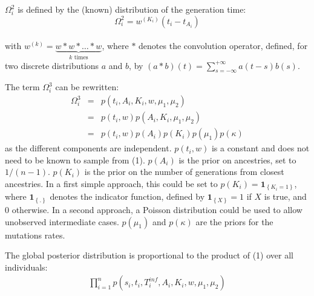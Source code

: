 \documentclass[10pt]{article}
\begin{document}
$\Omega_i^2$ is defined by the (known) distribution of the generation time:
$$
\Omega_i^2 = w^{\left(K_i\right)}(t_i - t_{A_i})
$$
~\\

with $w^{\left(k\right)} = \underbrace{w*w*\ldots*w}_{k \text{ times}} $, where $*$ denotes the convolution operator, defined, for two discrete distributions $a$ and $b$, by $\left(a*b\right)\left(t\right) = \sum_{s=-\infty}^{+\infty} a\left(t-s\right)b\left(s\right)$.

The term $\Omega_i^3$ can be rewritten:
\begin{eqnarray}
\Omega_i^3 &=&  p(t_i, A_i, K_i, w, \mu_1, \mu_2) \\
	 &=&  p(t_i, w) p(A_i, K_i,\mu_1, \mu_2) \\
	 &=&  p(t_i, w) p(A_i) p(K_i) p(\mu_1) p(\kappa) 
\end{eqnarray}
as the different components are independent.
$p(t_i, w)$ is a constant and does not need to be known to sample from (1).
$p(A_i)$ is the prior on ancestries, set to $1/(n-1)$.
$p(K_i)$ is the prior on the number of generations from closest ancestries. In a first simple approach, this could be set to $p(K_i) = \mathbf{1}_{\left\lbrace K_i=1\right\rbrace}$, where $\mathbf{1}_{\left\lbrace.\right\rbrace}$ denotes the indicator function, defined by $\mathbf{1}_{\left\lbrace X \right\rbrace}=1$ if $X$ is true, and $0$ otherwise. In a second approach, a Poisson distribution could be used to allow unobserved intermediate cases.
$ p(\mu_1)$ and $p(\kappa)$ are the priors for the mutations rates.

The global posterior distribution is proportional to the product of (1) over all individuals:
\begin{eqnarray}
\prod_{i=1}^n p(s_i, t_i, T_i^{inf}, A_i, K_i, w, \mu_1, \mu_2)
\end{eqnarray}
\end{document}
